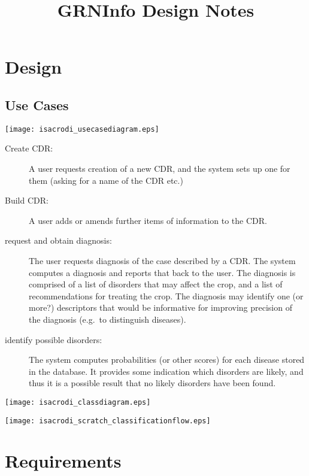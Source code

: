\documentclass[a4paper,fleqn]{article}
\begin{document}
\title{GRNInfo Design Notes}
\author{}
\maketitle

\section{Design}

\subsection{Use Cases}

\texttt{[image: isacrodi\_usecasediagram.eps]}

\begin{description}
\item[Create CDR:] A user requests creation of a new CDR, and the
  system sets up one for them (asking for a name of the CDR etc.)
\item[Build CDR:] A user adds or amends further items of information
  to the CDR.
\item[request and obtain diagnosis:] The user requests diagnosis of
  the case described by a CDR. The system computes a diagnosis and
  reports that back to the user. The diagnosis is comprised of a list
  of disorders that may affect the crop, and a list of recommendations
  for treating the crop. The diagnosis may identify one (or more?)
  descriptors that would be informative for improving precision of the
  diagnosis (e.g.\ to distinguish diseases).
\item[identify possible disorders:] The system computes probabilities
  (or other scores) for each disease stored in the database. It
  provides some indication which disorders are likely, and thus it is
  a possible result that no likely disorders have been found.
\end{description}


\texttt{[image: isacrodi\_classdiagram.eps]}

\pagebreak

\appendix



\texttt{[image: isacrodi\_scratch\_classificationflow.eps]}

\section{Requirements}
\end{document}
